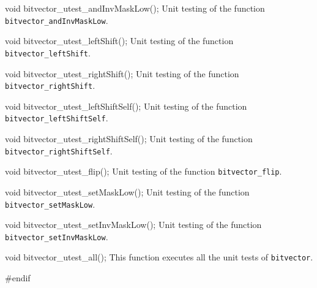 void bitvector_utest_andInvMaskLow();
\endcode
 \tab  Unit testing of the function {\tt bitvector\_andInvMaskLow}.
 \endtab
\code

void bitvector_utest_leftShift();
\endcode
 \tab  Unit testing of the function {\tt bitvector\_leftShift}.
 \endtab
\code

void bitvector_utest_rightShift();
\endcode
 \tab  Unit testing of the function {\tt bitvector\_rightShift}.
 \endtab
\code

void bitvector_utest_leftShiftSelf();
\endcode
 \tab  Unit testing of the function {\tt bitvector\_leftShiftSelf}.
 \endtab
\code

void bitvector_utest_rightShiftSelf();
\endcode
 \tab  Unit testing of the function {\tt bitvector\_rightShiftSelf}.
 \endtab
\code

void bitvector_utest_flip();
\endcode
 \tab  Unit testing of the function {\tt bitvector\_flip}.
 \endtab
\code

void bitvector_utest_setMaskLow();
\endcode
 \tab  Unit testing of the function {\tt bitvector\_setMaskLow}.
 \endtab
\code

void bitvector_utest_setInvMaskLow();
\endcode
 \tab  Unit testing of the function {\tt bitvector\_setInvMaskLow}.
 \endtab
\code

void bitvector_utest_all();
\endcode
 \tab  This function executes all the unit tests of {\tt bitvector}.
 \endtab
\code


\hide
#endif
\endhide
\endcode
